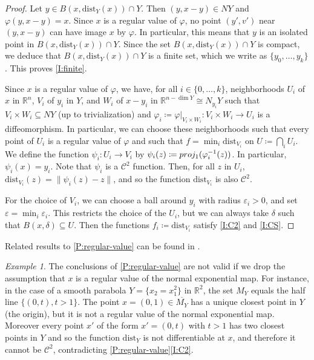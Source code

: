 \documentclass{amsart}
\newcommand{\R}{\mathbb{R}}
\newcommand{\dd}{\mathrm{dist}}
\theoremstyle{definition}
\theoremstyle{remark}
\newtheorem{example}[subsubsection]{Example}
\begin{document}
\begin{proof}
Let $y \in B(x, \dd_Y(x)) \cap Y$. Then $(y, x - y) \in N Y$ and $\varphi(y, x - y) = x$. Since $x$ is a regular value of $\varphi$, no point $(y', v')$ near $(y, x - y)$ can have image $x$ by $\varphi$. In particular, this means that $y$ is an isolated point in $B(x, \dd_Y(x)) \cap Y$. Since the set $B(x, \dd_Y(x)) \cap Y$ is compact, we deduce that $B(x, \dd_Y(x)) \cap Y$ is a finite set, which we write as $\{y_0, \ldots, y_k\}$. This proves \eqref{I:finite}.

Since $x$ is a regular value of $\varphi$, we have, for all $i \in \{0, \ldots, k\}$, neighborhoods $U_i$ of $x$ in $\R^n$, $V_i$ of $y_i$ in $Y$, and $W_i$ of $x - y_i$ in $\R^{n - \dim Y} \cong N_{y_i} Y$ such that $V_i \times W_i \subseteq N Y$ (up to trivialization) and $\varphi_i \coloneqq \varphi|_{V_i \times W_i} \colon V_i \times W_i \to U_i$ is a diffeomorphism. In particular, we can choose these neighborhoods such that every point of $U_i$ is a regular value of $\varphi$ and such that $f = \min_i \dd_{V_i}$ on $U \coloneqq \bigcap_i U_i$. We define the function $\psi_i \colon U_i \to V_i$ by $\psi_i(z) \coloneqq \textnormal{proj}_1 (\varphi_i^{-1}(z))$. In particular, $\psi_i(x) = y_i$. Note that $\psi_i$ is a $\mathcal{C}^2$ function. Then, for all $z$ in $U_i$, $\dd_{V_i}(z) = \|\psi_i(z) - z\|$, and so the function $\dd_{V_i}$ is also $\mathcal{C}^2$.

For the choice of $V_i$, we can choose a ball around $y_i$ with radius $\varepsilon_i > 0$, and set $\varepsilon = \min_i \varepsilon_i$. This restricts the choice of the $U_i$, but we can always take $\delta$ such that $B(x, \delta) \subseteq U$. Then the functions $f_i \coloneqq \dd_{V_i}$ satisfy \eqref{I:C2} and \eqref{I:CS}.
\end{proof}

Related results to \cref{P:regular-value} can be found in \cite[Sect.~3]{song2023generalized}.

\begin{example}\label{example:nonCS}
The conclusions of \cref{P:regular-value} are not valid if we drop the assumption that $x$ is a regular value of the normal exponential map. For instance, in the case of a smooth parabola $Y=\{x_2=x_1^2\}$ in $\R^2$, the set $M_Y$ equals the half line $\{(0, t), t > 1\}$. The point $x=(0,1) \in \overline{M_Y}$ has a unique closest point in $Y$ (the origin), but it is not a regular value of the normal exponential map. Moreover every point $x'$ of the form $x'=(0, t)$ with $t>1$ has two closest points in $Y$ and so the function $\dd_Y$ is not differentiable at $x$, and therefore it cannot be $\mathcal{C}^2$, contradicting \cref{P:regular-value}\eqref{I:C2}.
\end{example}
\end{document}
